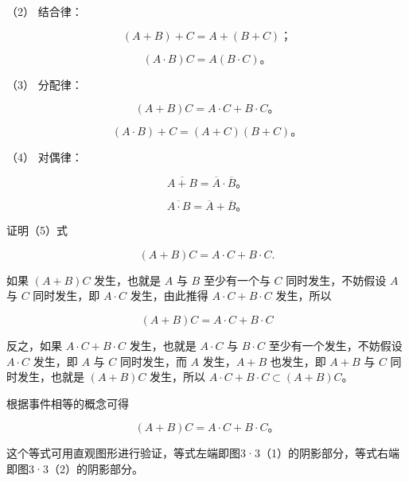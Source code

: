 （2） 结合律：

\[
(A + B) + C = A + (B + C)\text{；} \tag {3}
\]

\[
(A \cdot B) C = A (B \cdot C)\text{。} \tag {4}
\]

（3） 分配律：

\[
(A+B)C=A\cdot C+B\cdot C\text{。}\tag{5}
\]

\[
(A\cdot B)+C=(A+C)(B+C)\text{。}\tag{6}
\]

（4） 对偶律：

\[
\overline{A+B}=\overline A\cdot\overline B\text{。}\tag{7}
\]

\[
\overline{A\cdot B}=\overline A+\overline B\text{。}\tag{8}
\]

证明（5）式

\[
(A + B) C = A \cdot C + B \cdot C.
\]

 如果 \((A + B)C\) 发生，也就是 \(A\) 与 \(B\)
至少有一个与 \(C\) 同时发生，不妨假设 \(A\) 与 \(C\) 同时发生，即
\(A \cdot C\) 发生，由此推得 \(A \cdot C + B \cdot C\) 发生，所以

\[
(A + B) C = A \cdot C + B \cdot C
\]

反之，如果 \(A \cdot C + B \cdot C\) 发生，也就是 \(A \cdot C\) 与
\(B \cdot C\) 至少有一个发生，不妨假设 \(A \cdot C\) 发生，即 \(A\) 与
\(C\) 同时发生，而 \(A\) 发生，\(A + B\) 也发生，即 \(A + B\) 与 \(C\)
同时发生，也就是 \((A + B)C\) 发生，所以
\(A \cdot C + B \cdot C \subset (A + B)C\)。

根据事件相等的概念可得

\[
(A+B)C=A\cdot C+B\cdot C\text{。}
\]

这个等式可用直观图形进行验证，等式左端即图3·3（1）的阴影部分，等式右端即图3·3（2）的阴影部分。

